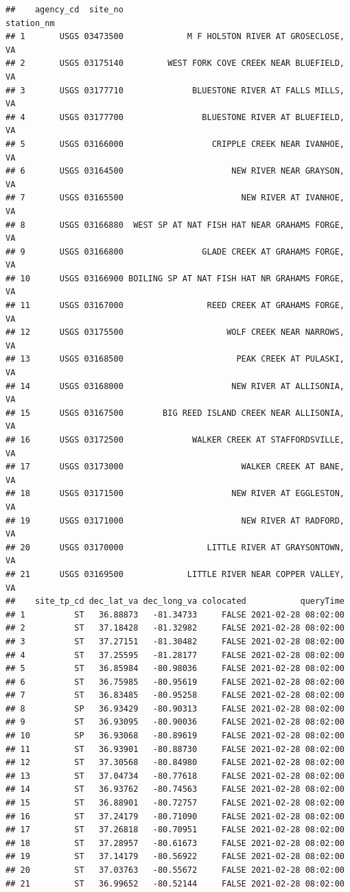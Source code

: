 \documentclass[
]{book}
\begin{document}
\begin{verbatim}
##    agency_cd  site_no                                      station_nm
## 1       USGS 03473500             M F HOLSTON RIVER AT GROSECLOSE, VA
## 2       USGS 03175140         WEST FORK COVE CREEK NEAR BLUEFIELD, VA
## 3       USGS 03177710              BLUESTONE RIVER AT FALLS MILLS, VA
## 4       USGS 03177700                BLUESTONE RIVER AT BLUEFIELD, VA
## 5       USGS 03166000                  CRIPPLE CREEK NEAR IVANHOE, VA
## 6       USGS 03164500                      NEW RIVER NEAR GRAYSON, VA
## 7       USGS 03165500                        NEW RIVER AT IVANHOE, VA
## 8       USGS 03166880  WEST SP AT NAT FISH HAT NEAR GRAHAMS FORGE, VA
## 9       USGS 03166800                GLADE CREEK AT GRAHAMS FORGE, VA
## 10      USGS 03166900 BOILING SP AT NAT FISH HAT NR GRAHAMS FORGE, VA
## 11      USGS 03167000                 REED CREEK AT GRAHAMS FORGE, VA
## 12      USGS 03175500                     WOLF CREEK NEAR NARROWS, VA
## 13      USGS 03168500                       PEAK CREEK AT PULASKI, VA
## 14      USGS 03168000                      NEW RIVER AT ALLISONIA, VA
## 15      USGS 03167500        BIG REED ISLAND CREEK NEAR ALLISONIA, VA
## 16      USGS 03172500              WALKER CREEK AT STAFFORDSVILLE, VA
## 17      USGS 03173000                        WALKER CREEK AT BANE, VA
## 18      USGS 03171500                      NEW RIVER AT EGGLESTON, VA
## 19      USGS 03171000                        NEW RIVER AT RADFORD, VA
## 20      USGS 03170000                 LITTLE RIVER AT GRAYSONTOWN, VA
## 21      USGS 03169500             LITTLE RIVER NEAR COPPER VALLEY, VA
##    site_tp_cd dec_lat_va dec_long_va colocated           queryTime
## 1          ST   36.88873   -81.34733     FALSE 2021-02-28 08:02:00
## 2          ST   37.18428   -81.32982     FALSE 2021-02-28 08:02:00
## 3          ST   37.27151   -81.30482     FALSE 2021-02-28 08:02:00
## 4          ST   37.25595   -81.28177     FALSE 2021-02-28 08:02:00
## 5          ST   36.85984   -80.98036     FALSE 2021-02-28 08:02:00
## 6          ST   36.75985   -80.95619     FALSE 2021-02-28 08:02:00
## 7          ST   36.83485   -80.95258     FALSE 2021-02-28 08:02:00
## 8          SP   36.93429   -80.90313     FALSE 2021-02-28 08:02:00
## 9          ST   36.93095   -80.90036     FALSE 2021-02-28 08:02:00
## 10         SP   36.93068   -80.89619     FALSE 2021-02-28 08:02:00
## 11         ST   36.93901   -80.88730     FALSE 2021-02-28 08:02:00
## 12         ST   37.30568   -80.84980     FALSE 2021-02-28 08:02:00
## 13         ST   37.04734   -80.77618     FALSE 2021-02-28 08:02:00
## 14         ST   36.93762   -80.74563     FALSE 2021-02-28 08:02:00
## 15         ST   36.88901   -80.72757     FALSE 2021-02-28 08:02:00
## 16         ST   37.24179   -80.71090     FALSE 2021-02-28 08:02:00
## 17         ST   37.26818   -80.70951     FALSE 2021-02-28 08:02:00
## 18         ST   37.28957   -80.61673     FALSE 2021-02-28 08:02:00
## 19         ST   37.14179   -80.56922     FALSE 2021-02-28 08:02:00
## 20         ST   37.03763   -80.55672     FALSE 2021-02-28 08:02:00
## 21         ST   36.99652   -80.52144     FALSE 2021-02-28 08:02:00
\end{verbatim}
\end{document}
